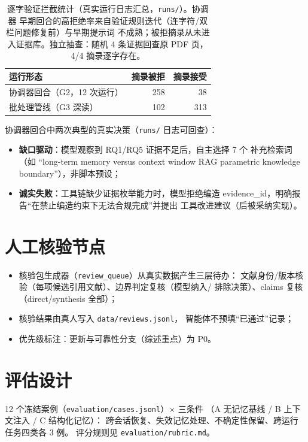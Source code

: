 \documentclass[UTF8, a4paper, zihao=-4]{ctexart}
\begin{document}
\begin{table}[h]
\centering
\begin{tabular}{lrr}
\toprule
运行形态 & 摘录被拒 & 摘录接受 \\
\midrule
协调器回合（G2，12 次运行） & 258 & 38 \\
批处理管线（G3 深读） & 102 & 313 \\
\bottomrule
\end{tabular}
\caption{逐字验证拦截统计（真实运行日志汇总，\texttt{runs/}）。协调器
早期回合的高拒绝率来自验证规则迭代（连字符/双栏问题修复前）与早期提示词
不成熟；被拒摘录从未进入证据库。独立抽查：随机 4 条证据回查原 PDF 页，
4/4 摘录逐字存在。}
\end{table}

协调器回合中两次典型的真实决策（\texttt{runs/} 日志可回查）：
\begin{itemize}
  \item \textbf{缺口驱动}：模型观察到 RQ1/RQ5 证据不足后，自主选择 7 个
        补充检索词（如 ``long-term memory versus context window RAG
        parametric knowledge boundary''），非脚本预设；
  \item \textbf{诚实失败}：工具链缺少证据枚举能力时，模型拒绝编造
        evidence\_id，明确报告``在禁止编造约束下无法合规完成''并提出
        工具改进建议（后被采纳实现）。
\end{itemize}

\section{人工核验节点}

\begin{itemize}
  \item 核验包生成器（\texttt{review\_queue}）从真实数据产生三层待办：
        文献身份/版本核验（每项候选引用文献）、边界判定复核（模型纳入/
        排除决策）、claims 复核（direct/synthesis 全部）；
  \item 核验结果由真人写入 \texttt{data/reviews.jsonl}，
        智能体不预填``已通过''记录；
  \item 优先级标注：更新与可靠性分支（综述重点）为 P0。
\end{itemize}

\section{评估设计}

12 个冻结案例（\texttt{evaluation/cases.jsonl}）× 三条件
（A 无记忆基线 / B 上下文注入 / C 结构化记忆）：
跨会话恢复、失效记忆处理、不确定性保留、跨运行任务四类各 3 例。
评分规则见 \texttt{evaluation/rubric.md}。
\end{document}
